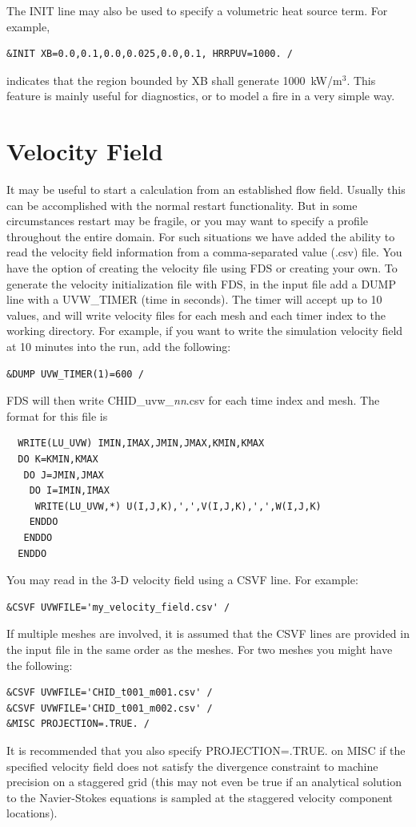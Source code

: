 \documentclass[11pt]{book}
\begin{document}
The {\ct INIT} line may also be used to specify a volumetric heat source term. For example,
\begin{lstlisting}
&INIT XB=0.0,0.1,0.0,0.025,0.0,0.1, HRRPUV=1000. /
\end{lstlisting}
indicates that the region bounded by {\ct XB} shall generate 1000~kW/m$^3$. This feature is mainly useful for diagnostics, or to model a fire in a very simple way.


\section{Velocity Field}
\label{info:velo_restart}
\label{info:CSVF}

It may be useful to start a calculation from an established flow field.  Usually this can be accomplished with the normal restart functionality.  But in some circumstances restart may be fragile, or you may want to specify a profile throughout the entire domain.  For such situations we have added the ability to read the velocity field information from a comma-separated value (.csv) file.  You have the option of creating the velocity file using FDS or creating your own.  To generate the velocity initialization file with FDS, in the input file add a {\ct DUMP} line with a {\ct UVW\_TIMER} (time in seconds).  The timer will accept up to 10 values, and will write velocity files for each mesh and each timer index to the working directory.  For example, if you want to write the simulation velocity field at 10 minutes into the run, add the following:
\begin{lstlisting}
&DUMP UVW_TIMER(1)=600 /
\end{lstlisting}
FDS will then write {\ct CHID\_uvw\_{\it nn}.csv} for each time index and mesh.  The format for this file is
\begin{lstlisting}
  WRITE(LU_UVW) IMIN,IMAX,JMIN,JMAX,KMIN,KMAX
  DO K=KMIN,KMAX
   DO J=JMIN,JMAX
    DO I=IMIN,IMAX
     WRITE(LU_UVW,*) U(I,J,K),',',V(I,J,K),',',W(I,J,K)
    ENDDO
   ENDDO
  ENDDO
\end{lstlisting}
You may read in the 3-D velocity field using a {\ct CSVF} line.  For example:
\begin{lstlisting}
&CSVF UVWFILE='my_velocity_field.csv' /
\end{lstlisting}
If multiple meshes are involved, it is assumed that the {\ct CSVF} lines are provided in the input file in the same order as the meshes. For two meshes you might have the following:
\begin{lstlisting}
&CSVF UVWFILE='CHID_t001_m001.csv' /
&CSVF UVWFILE='CHID_t001_m002.csv' /
&MISC PROJECTION=.TRUE. /
\end{lstlisting}
It is recommended that you also specify {\ct PROJECTION=.TRUE.} on {\ct MISC} if the specified velocity field does not satisfy the divergence constraint to machine precision on a staggered grid (this may not even be true if an analytical solution to the Navier-Stokes equations is sampled at the staggered velocity component locations).
\end{document}
